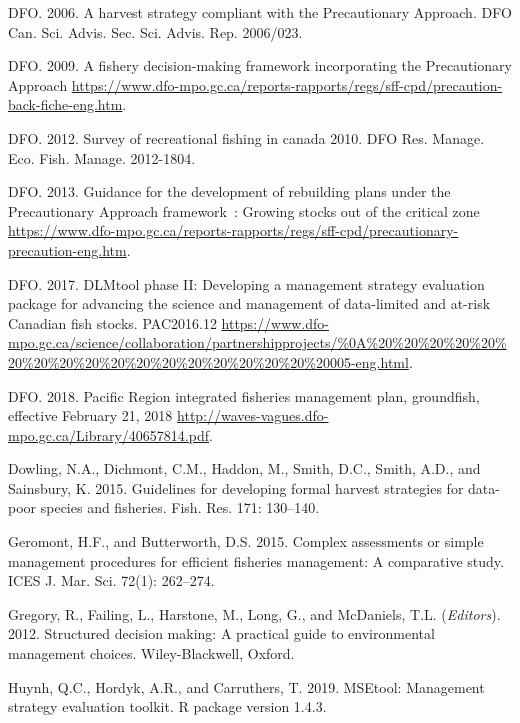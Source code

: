 \documentclass[11pt]{book}
\begin{document}
\leavevmode\hypertarget{ref-dfo2006}{}%
DFO. 2006. A harvest strategy compliant with the Precautionary Approach. DFO Can. Sci. Advis. Sec. Sci. Advis. Rep. 2006/023.

\leavevmode\hypertarget{ref-dfo2009}{}%
DFO. 2009. A fishery decision-making framework incorporating the Precautionary Approach \url{https://www.dfo-mpo.gc.ca/reports-rapports/regs/sff-cpd/precaution-back-fiche-eng.htm}.

\leavevmode\hypertarget{ref-dfo2012}{}%
DFO. 2012. Survey of recreational fishing in canada 2010. DFO Res. Manage. Eco. Fish. Manage. 2012-1804.

\leavevmode\hypertarget{ref-dfo2013}{}%
DFO. 2013. Guidance for the development of rebuilding plans under the Precautionary Approach framework~: Growing stocks out of the critical zone \url{https://www.dfo-mpo.gc.ca/reports-rapports/regs/sff-cpd/precautionary-precaution-eng.htm}.

\leavevmode\hypertarget{ref-dfo_dlmtool_2017}{}%
DFO. 2017. DLMtool phase II: Developing a management strategy evaluation package for advancing the science and management of data-limited and at-risk Canadian fish stocks. PAC2016.12 \url{https://www.dfo-mpo.gc.ca/science/collaboration/partnershipprojects/\%0A\%20\%20\%20\%20\%20\%20\%20\%20\%20\%20\%20\%20\%20\%20\%20\%20\%20\%20005-eng.html}.

\leavevmode\hypertarget{ref-ifmp2018}{}%
DFO. 2018. Pacific Region integrated fisheries management plan, groundfish, effective February 21, 2018 \url{http://waves-vagues.dfo-mpo.gc.ca/Library/40657814.pdf}.

\leavevmode\hypertarget{ref-dowling2015a}{}%
Dowling, N.A., Dichmont, C.M., Haddon, M., Smith, D.C., Smith, A.D., and Sainsbury, K. 2015. Guidelines for developing formal harvest strategies for data-poor species and fisheries. Fish. Res. 171: 130--140.

\leavevmode\hypertarget{ref-geromont2015}{}%
Geromont, H.F., and Butterworth, D.S. 2015. Complex assessments or simple management procedures for efficient fisheries management: A comparative study. ICES J. Mar. Sci. 72(1): 262--274.

\leavevmode\hypertarget{ref-gregory2012}{}%
Gregory, R., Failing, L., Harstone, M., Long, G., and McDaniels, T.L. (\emph{Editors}). 2012. Structured decision making: A practical guide to environmental management choices. Wiley-Blackwell, Oxford.

\leavevmode\hypertarget{ref-huynh_msetool_2019}{}%
Huynh, Q.C., Hordyk, A.R., and Carruthers, T. 2019. MSEtool: Management strategy evaluation toolkit. R package version 1.4.3.
\end{document}
